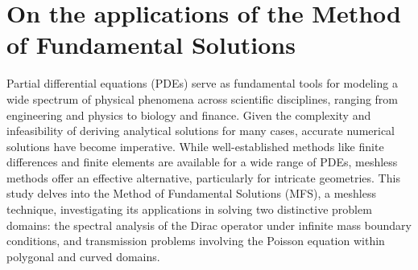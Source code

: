 \label{chap:intro}




\section{On the applications of the Method of Fundamental Solutions}

Partial differential equations (\ac{PDE}s) serve as fundamental tools for modeling a wide spectrum of physical phenomena across scientific disciplines, ranging from engineering and physics to biology and finance. Given the complexity and infeasibility of deriving analytical solutions for many cases, accurate numerical solutions have become imperative. While well-established methods like finite differences and finite elements are available for a wide range of \ac{PDE}s, meshless methods offer an effective alternative, particularly for intricate geometries. This study delves into the Method of Fundamental Solutions (MFS), a meshless technique, investigating its applications in solving two distinctive problem domains: the spectral analysis of the Dirac operator under infinite mass boundary conditions, and transmission problems involving the Poisson equation within polygonal and curved domains.

